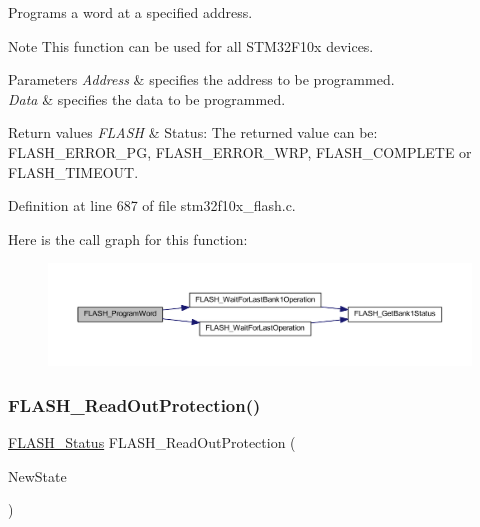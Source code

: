 Programs a word at a specified address. 

\begin{DoxyNote}{Note}
This function can be used for all S\+T\+M32\+F10x devices. 
\end{DoxyNote}

\begin{DoxyParams}{Parameters}
{\em Address} & specifies the address to be programmed. \\
\hline
{\em Data} & specifies the data to be programmed. \\
\hline
\end{DoxyParams}

\begin{DoxyRetVals}{Return values}
{\em F\+L\+A\+SH} & Status\+: The returned value can be\+: F\+L\+A\+S\+H\+\_\+\+E\+R\+R\+O\+R\+\_\+\+PG, F\+L\+A\+S\+H\+\_\+\+E\+R\+R\+O\+R\+\_\+\+W\+RP, F\+L\+A\+S\+H\+\_\+\+C\+O\+M\+P\+L\+E\+TE or F\+L\+A\+S\+H\+\_\+\+T\+I\+M\+E\+O\+UT. \\
\hline
\end{DoxyRetVals}


Definition at line 687 of file stm32f10x\+\_\+flash.\+c.

Here is the call graph for this function\+:
\nopagebreak
\begin{figure}[H]
\begin{center}
\leavevmode
\includegraphics[width=350pt]{group___f_l_a_s_h___private___functions_gaac9a2f400b92537bd42a6bd7cc237b11_cgraph}
\end{center}
\end{figure}
\mbox{\label{group___f_l_a_s_h___private___functions_ga0b8d1a8277950c890bbc247bbeafb40f}} 
\subsubsection{\texorpdfstring{F\+L\+A\+S\+H\+\_\+\+Read\+Out\+Protection()}{FLASH\_ReadOutProtection()}}
{\footnotesize\ttfamily \hyperlink{group___f_l_a_s_h___exported___types_gadc63a6f3404ff1f71229a66915e9cdc0}{F\+L\+A\+S\+H\+\_\+\+Status} F\+L\+A\+S\+H\+\_\+\+Read\+Out\+Protection (\begin{DoxyParamCaption}\item[{\hyperlink{group___exported__types_gac9a7e9a35d2513ec15c3b537aaa4fba1}{Functional\+State}}]{New\+State }\end{DoxyParamCaption})}



